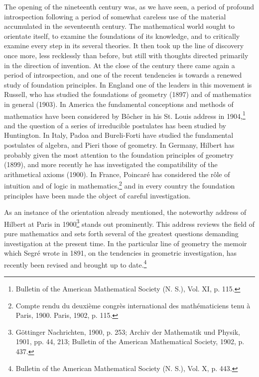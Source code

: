 \documentclass[oneside]{book}
\begin{document}
The opening of the nineteenth century was, as we have seen, a period
of profound introspection following a period of somewhat careless
use of the material accumulated in the seventeenth century. The
mathematical world sought to orientate itself, to examine the
foundations of its knowledge, and to critically examine every step
in its several theories. It then took up the line of discovery once
more, less recklessly than before, but still with thoughts directed
primarily in the direction of invention. At the close of the
century there came again a period of introspection, and one of the
recent tendencies is towards a renewed study of foundation
principles. In England one of the leaders in this movement is
Russell, who has studied the foundations of geometry (1897) and of
mathematics in general (1903). In America the fundamental
conceptions and methods of mathematics have been considered by
B\^ocher in his St. Louis address in 1904,\footnote{Bulletin of the
American Mathematical Society (N. S.), Vol. XI, p. 115.} and the
question of a series of irreducible postulates has been studied by
Huntington. In Italy, Padoa and Bureli-Forti have studied the
fundamental postulates of algebra, and Pieri those of geometry. In
Germany, Hilbert has probably given the most attention to the
foundation principles of geometry (1899), and more recently he has
investigated the compatibility of the arithmetical axioms (1900). In
France, Poincar\'e has considered the r\^ole of intuition and of
logic in mathematics,\footnote{Compte rendu du deuxi\`eme congr\`es
international des math\'ematiciens tenu \`a Paris, 1900. Paris,
1902, p. 115.} and in every country the foundation principles have
been made the object of careful investigation.

As an instance of the orientation already mentioned, the noteworthy
address of Hilbert at Paris in 1900\footnote{G\"ottinger
Nachrichten, 1900, p. 253; Archiv der Mathematik und Physik, 1901,
pp. 44, 213; Bulletin of the American Mathematical Society, 1902,
p. 437.} stands out prominently. This address reviews the field of
pure mathematics and sets forth several of the greatest questions
demanding investigation at the present time. In the particular line
of geometry the memoir which Segr\'e wrote in 1891, on the
tendencies in geometric investigation, has recently been revised and
brought up to date.\footnote{Bulletin of the American Mathematical
Society (N. S.), Vol. X, p. 443.}
\end{document}

